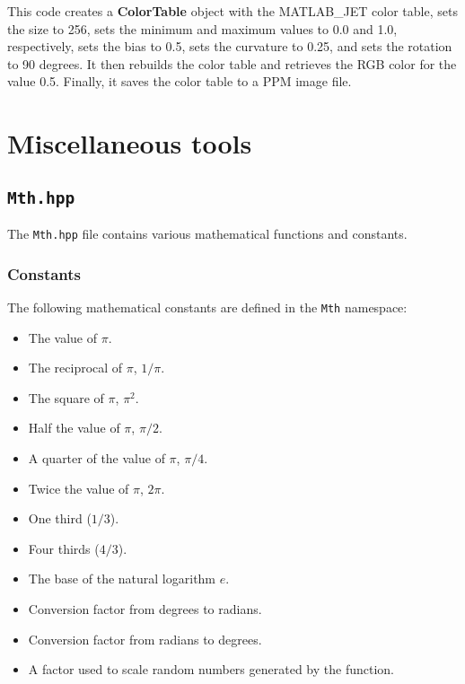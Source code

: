 \documentclass[a4paper,onecolumn,11pt]{doofus}
\begin{document}
This code creates a \textbf{ColorTable} object with the MATLAB\_JET color table, sets the size to 256, sets the minimum and maximum values to 0.0 and 1.0, respectively, sets the bias to 0.5, sets the curvature to 0.25, and sets the rotation to 90 degrees. It then rebuilds the color table and retrieves the RGB color for the value 0.5. Finally, it saves the color table to a PPM image file.


\section{Miscellaneous tools}


\subsection{\texttt{Mth.hpp}}

The \texttt{Mth.hpp} file contains various mathematical functions and constants.

\subsubsection*{Constants}

The following mathematical constants are defined in the \texttt{Mth} namespace:
\begin{itemize}
\item {} The value of $\pi$.
\item {} The reciprocal of $\pi$, $1/\pi$.
\item {} The square of $\pi$, $\pi^2$.
\item {} Half the value of $\pi$, $\pi/2$.
\item {} A quarter of the value of $\pi$, $\pi/4$.
\item {} Twice the value of $\pi$, $2\pi$.
\item {} One third ($1/3$).
\item {} Four thirds ($4/3$).
\item {} The base of the natural logarithm $e$.
\item {} Conversion factor from degrees to radians.
\item {} Conversion factor from radians to degrees.
\item {} A factor used to scale random numbers generated by the  function.
\end{itemize}
\end{document}
